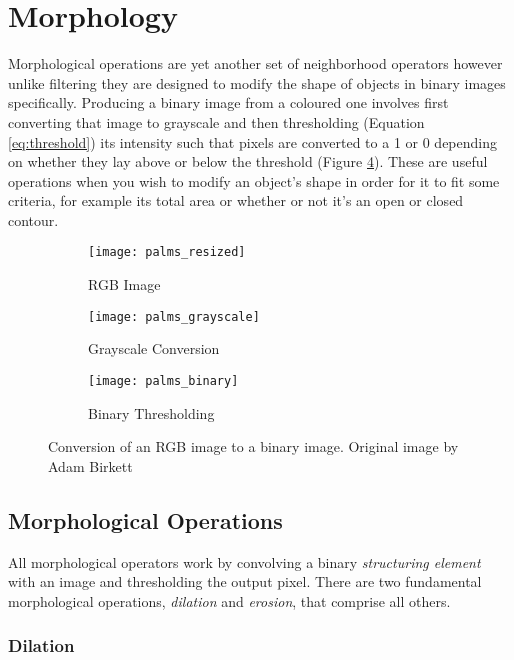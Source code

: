 \section{Morphology}

Morphological operations are yet another set of neighborhood operators however unlike filtering they are designed to modify the shape of objects in binary images specifically. Producing a binary image from a coloured one involves first converting that image to grayscale and then thresholding (Equation \ref{eq:threshold}) its intensity such that pixels are converted to a 1 or 0 depending on whether they lay above or below the threshold (Figure \ref{fig:thresholding}). These are useful operations when you wish to modify an object's shape in order for it to fit some criteria, for example its total area or whether or not it's an open or closed contour.

\begin{figure}[htbp]
    \centering
    \begin{subfigure}[b]{0.3\textwidth}
        \texttt{[image: palms\_resized]}
        \caption{RGB Image}
        \label{fig:emu_noise}
    \end{subfigure}
    \begin{subfigure}[b]{0.3\textwidth}
        \texttt{[image: palms\_grayscale]}
        \caption{Grayscale Conversion}
        \label{fig:emu_gauss}
    \end{subfigure}
    \begin{subfigure}[b]{0.3\textwidth}
        \texttt{[image: palms\_binary]}
        \caption{Binary Thresholding}
        \label{fig:emu_median}
    \end{subfigure}
    \captionsetup{format = hang}
    \caption{Conversion of an RGB image to a binary image. Original image by Adam Birkett}
    \label{fig:thresholding}
\end{figure}

\subsection{Morphological Operations}

All morphological operators work by convolving a binary \emph{structuring element} with an image and thresholding the output pixel. There are two fundamental morphological operations, \emph{dilation} and \emph{erosion}, that comprise all others. 

\subsubsection{Dilation}

